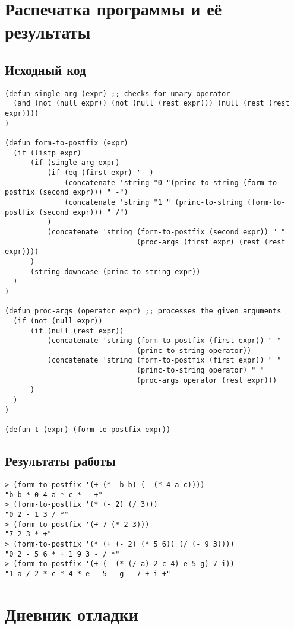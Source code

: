 \documentclass[a4paper, 12pt]{article}
\begin{document}
\section{Распечатка программы и её результаты}

\subsection{Исходный код}
\begin{lstlisting}
(defun single-arg (expr) ;; checks for unary operator
  (and (not (null expr)) (not (null (rest expr))) (null (rest (rest expr))))
)

(defun form-to-postfix (expr) 
  (if (listp expr)
      (if (single-arg expr)
          (if (eq (first expr) '- )
              (concatenate 'string "0 "(princ-to-string (form-to-postfix (second expr))) " -")
              (concatenate 'string "1 " (princ-to-string (form-to-postfix (second expr))) " /")
          )
          (concatenate 'string (form-to-postfix (second expr)) " "
                               (proc-args (first expr) (rest (rest expr))))
      )
      (string-downcase (princ-to-string expr))
  )
)

(defun proc-args (operator expr) ;; processes the given arguments
  (if (not (null expr))
      (if (null (rest expr))
          (concatenate 'string (form-to-postfix (first expr)) " " 
                               (princ-to-string operator)) 
          (concatenate 'string (form-to-postfix (first expr)) " " 
                               (princ-to-string operator) " " 
                               (proc-args operator (rest expr)))
      )
  )
)

(defun t (expr) (form-to-postfix expr))
\end{lstlisting}


\subsection{Результаты работы}
\begin{lstlisting}
> (form-to-postfix '(+ (*  b b) (- (* 4 a c))))
"b b * 0 4 a * c * - +"
> (form-to-postfix '(* (- 2) (/ 3)))
"0 2 - 1 3 / *"
> (form-to-postfix '(+ 7 (* 2 3)))
"7 2 3 * +"
> (form-to-postfix '(* (+ (- 2) (* 5 6)) (/ (- 9 3))))
"0 2 - 5 6 * + 1 9 3 - / *"
> (form-to-postfix '(+ (- (* (/ a) 2 c 4) e 5 g) 7 i))
"1 a / 2 * c * 4 * e - 5 - g - 7 + i +"
\end{lstlisting}


\section{Дневник отладки}
\end{document}
